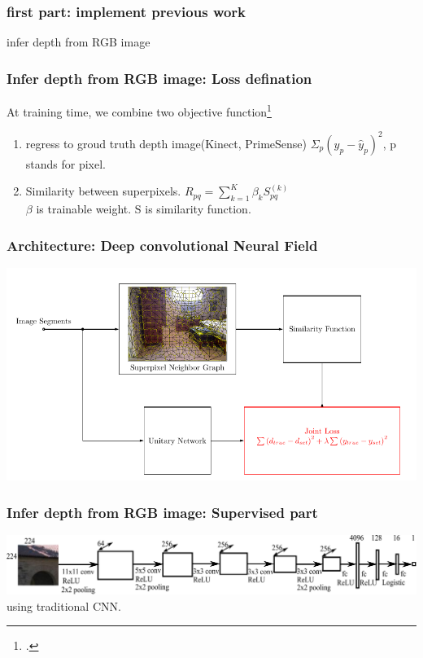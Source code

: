 \documentclass{beamer}
\begin{document}
\begin{frame}
\frametitle{first part: implement previous work}
\Huge{\centerline{infer depth from RGB image}}
\end{frame}

\begin{frame}
\frametitle{Infer depth from RGB image: Loss defination}
At training time, we combine two objective function\footcite{liu2015deep}
\begin{enumerate}
\item regress to groud truth depth image(Kinect, PrimeSense)
$ \Sigma_{p}(y_p-\hat{y}_p)^2$, p stands for pixel.
\item Similarity between superpixels.
$R_{pq} = \sum_{k=1}^K \beta_k S_{pq}^{(k)}$\\
 $\beta$ is trainable weight. S is similarity function.
\end{enumerate}
\end{frame}


\begin{frame}
\frametitle{Architecture: Deep convolutional Neural Field}
\hspace*{-1cm}
\includegraphics[width=1.2\textwidth]{arch.png}
\end{frame}


\begin{frame}
\frametitle{Infer depth from RGB image: Supervised part}
\includegraphics[width=\linewidth]{fig/cnn_unary.pdf}\\
using traditional CNN.
\end{frame}
\end{document}
